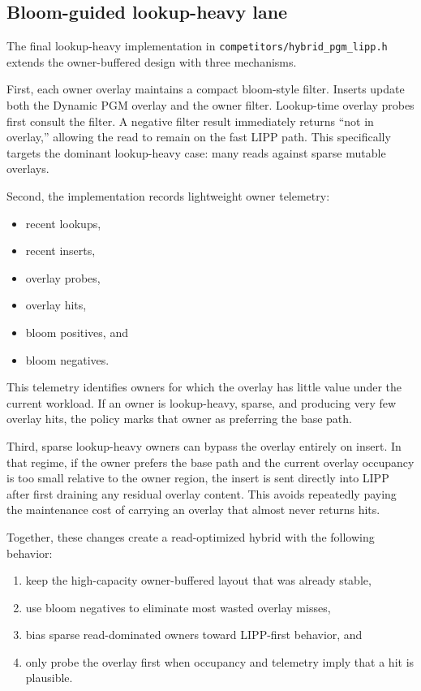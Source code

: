 \documentclass[11pt]{article}
\begin{document}
\subsection*{Bloom-guided lookup-heavy lane}
The final lookup-heavy implementation in \texttt{competitors/hybrid\_pgm\_lipp.h} extends the owner-buffered design with three mechanisms.

First, each owner overlay maintains a compact bloom-style filter. Inserts update both the Dynamic PGM overlay and the owner filter. Lookup-time overlay probes first consult the filter. A negative filter result immediately returns ``not in overlay,'' allowing the read to remain on the fast LIPP path. This specifically targets the dominant lookup-heavy case: many reads against sparse mutable overlays.

Second, the implementation records lightweight owner telemetry:
\begin{itemize}
  \item recent lookups,
  \item recent inserts,
  \item overlay probes,
  \item overlay hits,
  \item bloom positives, and
  \item bloom negatives.
\end{itemize}
This telemetry identifies owners for which the overlay has little value under the current workload. If an owner is lookup-heavy, sparse, and producing very few overlay hits, the policy marks that owner as preferring the base path.

Third, sparse lookup-heavy owners can bypass the overlay entirely on insert. In that regime, if the owner prefers the base path and the current overlay occupancy is too small relative to the owner region, the insert is sent directly into LIPP after first draining any residual overlay content. This avoids repeatedly paying the maintenance cost of carrying an overlay that almost never returns hits.

Together, these changes create a read-optimized hybrid with the following behavior:
\begin{enumerate}
  \item keep the high-capacity owner-buffered layout that was already stable,
  \item use bloom negatives to eliminate most wasted overlay misses,
  \item bias sparse read-dominated owners toward LIPP-first behavior, and
  \item only probe the overlay first when occupancy and telemetry imply that a hit is plausible.
\end{enumerate}
\end{document}
